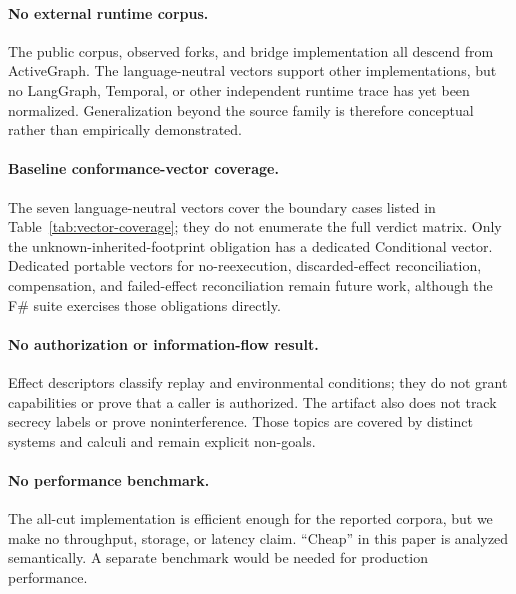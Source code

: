 \paragraph{No external runtime corpus.}
The public corpus, observed forks, and bridge implementation all descend from
ActiveGraph.  The language-neutral vectors support other implementations, but
no LangGraph, Temporal, or other independent runtime trace has yet been
normalized.  Generalization beyond the source family is therefore conceptual
rather than empirically demonstrated.

\paragraph{Baseline conformance-vector coverage.}
The seven language-neutral vectors cover the boundary cases listed in
Table~\ref{tab:vector-coverage}; they do not enumerate the full verdict matrix.
Only the unknown-inherited-footprint obligation has a dedicated Conditional
vector.  Dedicated portable vectors for no-reexecution, discarded-effect
reconciliation, compensation, and failed-effect reconciliation remain future
work, although the F\# suite exercises those obligations directly.

\paragraph{No authorization or information-flow result.}
Effect descriptors classify replay and environmental conditions; they do not
grant capabilities or prove that a caller is authorized.  The artifact also
does not track secrecy labels or prove noninterference.  Those topics are
covered by distinct systems and calculi and remain explicit non-goals.

\paragraph{No performance benchmark.}
The all-cut implementation is efficient enough for the reported corpora, but
we make no throughput, storage, or latency claim.  ``Cheap'' in this paper is
analyzed semantically.  A separate benchmark would be needed for production
performance.
